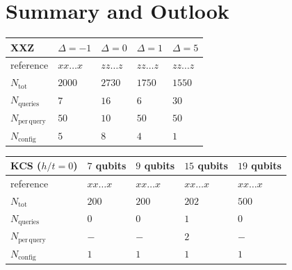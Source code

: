 \documentclass[pra,aps,showpacs,groupedaddress,superscriptaddress,twocolumn,toc=flat,biblatex,footinbib]{revtex4-1}
\begin{document}
\section{Summary and Outlook \label{sec:Summary}}

\begin{table}[t]
\begin{tabular}{p{2.3 cm}|p{1.3 cm}p{1.3 cm}p{1.3 cm}p{1.3 cm}}
\textbf{XXZ}                & $\Delta=-1$ & $\Delta=0$ & $\Delta=1$ & $\Delta=5$ \\\hline
reference        &    $xx\dots x$      &       $zz\dots z$  &  $zz\dots z$        &    $zz\dots z$      \\
$N_{\mathrm{tot}}$        &    $2000$      &       $2730$   &  $1750$        &    $1550$       \\
$N_{\mathrm{queries}}$  & $7$         &    $16$      & $6$         &  $30$  \\  
$N_{\mathrm{per\, query}}$  & $50$         &    $10$      & $50$         &  $50$  \\  
$N_{\mathrm{config}}$  & $5$         &    $8$      & $4$         &  $1$ \\
\end{tabular}
\newline
\vspace*{0.2 cm}
\newline
\begin{tabular}{p{2.3 cm}|p{1.3 cm}p{1.3 cm}p{1.3 cm}p{1.3 cm}}
\textbf{KCS} ($h/t=0$)                & $7$ qubits & $9$ qubits & $15$ qubits & $19$ qubits \\\hline
reference        &    $xx\dots x$      &       $xx\dots x$  &  $xx\dots x$        &    $xx\dots x$      \\
$N_{\mathrm{tot}}$         &    $200$      &       $200$   &  $202$        &    $500$       \\
$N_{\mathrm{queries}}$  & $0$         &    $0$      & $1$  &  $0$   \\ 
$N_{\mathrm{per\, query}}$  & $-$         &    $-$      & $2$         &  $-$  \\ 
$N_{\mathrm{config}}$  & $1$         &    $1$      & $1$         &  $1$         
\end{tabular}
\newline
\vspace*{0.2 cm}
\newline
\begin{tabular}{p{2.3 cm}|p{1.3 cm}p{1.3 cm}p{1.3 cm}p{1.3 cm}}

\end{tabular}
\end{table}
\end{document}
